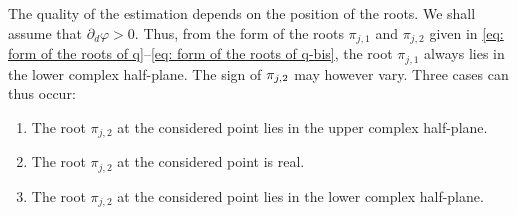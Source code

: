 \documentclass[10pt]{amsart}
\theoremstyle{plain}
\theoremstyle{definition}
\let \Im \relax
\DeclareMathOperator{\Im}{Im}
\begin{document}
The quality of the estimation depends on the
position of the roots. We shall assume that $\partial_d
\varphi >0$. Thus, from the form of the roots $\pi_{j,1}$
and $\pi_{j,2}$ given in \eqref{eq: form of the roots of q}--\eqref{eq: form of the
roots of q-bis},
the root $\pi_{j,1}$ always lies in the lower
complex half-plane. The sign of $\Im \pi_{j,2}$ may however vary.
Three cases can thus occur:
\begin{enumerate}
\item The root $\pi_{j,2}$ at the considered point lies in the upper complex half-plane.
\item The root $\pi_{j,2}$ at the considered point is real.
\item The root $\pi_{j,2}$ at the considered point lies in the lower complex half-plane.
\end{enumerate}
\end{document}
